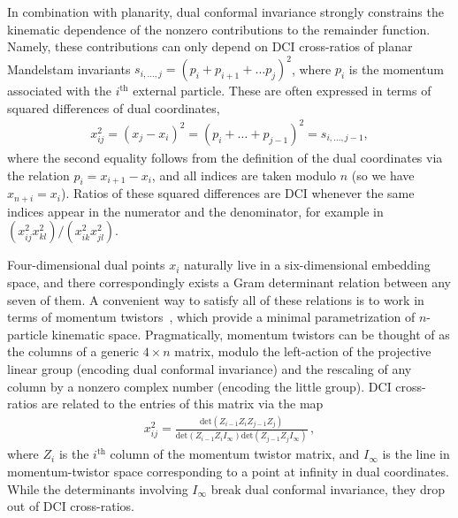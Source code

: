 \documentclass[11pt]{article}
\begin{document}
In combination with planarity, dual conformal invariance strongly constrains the kinematic dependence of the nonzero contributions to the remainder function. Namely, these contributions can only depend on DCI cross-ratios of planar Mandelstam invariants $s_{i,\dots,j} = (p_i + p_{i+1} + \dots p_{j})^2$, where $p_i$ is the momentum associated with the $i^{\text{th}}$ external particle. These are often expressed in terms of squared differences of dual coordinates, 
\begin{align}
x_{ij}^2 = (x_j - x_i)^2 = (p_i+ \dots + p_{j-1})^2 = s_{i,\dots,j-1},
\end{align}
where the second equality follows from the definition of the dual coordinates via the relation $p_i = x_{i+1} - x_i$, and all indices are taken modulo $n$ (so we have $x_{n+i} = x_i$). Ratios of these squared differences are DCI whenever the same indices appear in the numerator and the denominator, for example in $(x_{ij}^2 x_{kl}^2)/(x_{ik}^2 x_{jl}^2)$.  

Four-dimensional dual points $x_i$ naturally live in a six-dimensional embedding space, and there correspondingly exists a Gram determinant relation between any seven of them. A convenient way to satisfy all of these relations is to work in terms of momentum twistors~\cite{Hodges:2009hk}, which provide a minimal parametrization of $n$-particle kinematic space. Pragmatically, momentum twistors can be thought of as the columns of a generic $4\! \times \! n$ matrix, modulo the left-action of the projective linear group (encoding dual conformal invariance) and the rescaling of any column by a nonzero complex number (encoding the little group). DCI cross-ratios are related to the entries of this matrix via the map
\begin{align}
x_{ij}^2 = \frac{\text{det}(Z_{i-1} Z_i Z_{j-1} Z_j)}{\text{det}(Z_{i-1} Z_i I_\infty) \text{det}(Z_{j-1} Z_j I_\infty)}  \, ,
\end{align} 
where $Z_i$ is the $i^\text{th}$ column of the momentum twistor matrix, and $I_\infty$ is the line in momentum-twistor space corresponding to a point at infinity in dual coordinates. While the determinants involving $I_\infty$ break dual conformal invariance, they drop out of DCI cross-ratios. 
\end{document}
